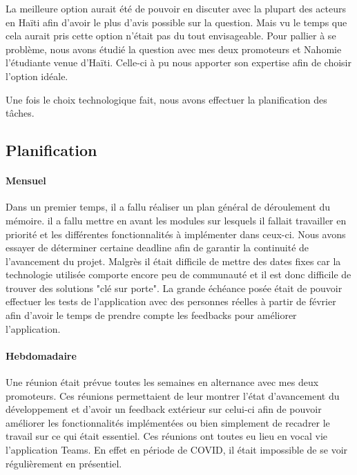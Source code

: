 \documentclass{EPL-master-thesis-covers-FR}
\begin{document}
			La meilleure option aurait été de pouvoir en discuter avec la plupart des acteurs en Haïti afin d'avoir le plus d'avis possible sur la question. Mais vu le temps que cela aurait pris cette option n'était pas du tout envisageable. Pour pallier à se problème, nous avons étudié la question avec mes deux promoteurs et Nahomie l'étudiante venue d'Haïti. Celle-ci à pu nous apporter son expertise afin de choisir l'option idéale.
			
			Une fois le choix technologique fait, nous avons effectuer la planification des tâches.
		
		


			\subsection*{Planification}
				\label{sec:planification}
				
				\paragraph*{Mensuel}
				Dans un premier temps, il a fallu réaliser un plan général de déroulement du mémoire. il a fallu mettre en avant les modules sur lesquels il fallait travailler en priorité et les différentes fonctionnalités à implémenter dans ceux-ci.   Nous avons essayer de déterminer certaine deadline afin de garantir la continuité de l'avancement du projet. Malgrès il était difficile de mettre des dates fixes car la technologie utilisée comporte encore peu de communauté et il est donc difficile de trouver des solutions "clé sur porte". 
				La grande échéance posée était de pouvoir effectuer les tests de l'application avec des personnes réelles à partir de février afin d'avoir le temps de prendre compte les feedbacks pour améliorer l'application.
				
				\paragraph*{Hebdomadaire} 
				Une réunion était prévue toutes les semaines en alternance avec mes deux promoteurs. Ces réunions permettaient de leur montrer l'état d'avancement du développement et d'avoir un feedback extérieur sur celui-ci afin de pouvoir améliorer les fonctionnalités implémentées ou bien simplement de recadrer le travail sur ce qui était essentiel. 
				Ces réunions ont toutes eu lieu en vocal vie l'application Teams. En effet en période de COVID, il était impossible de se voir régulièrement en présentiel.
				
\end{document}

